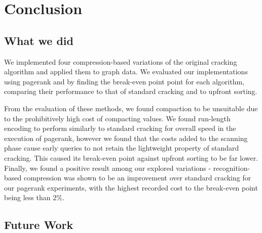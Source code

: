 \chapter{Conclusion}

\label{ch:conclusion}

\section{What we did}

We implemented four compression-based variations of the original cracking algorithm and applied them to graph data. We evaluated our implementations using pagerank and by finding the break-even point point for each algorithm, comparing their performance to that of standard cracking and to upfront sorting. 

From the evaluation of these methods, we found compaction to be unsuitable due to the prohibitively high cost of compacting values. We found run-length encoding to perform similarly to standard cracking for overall speed in the execution of pagerank, however we found that the costs added to the scanning phase cause early queries to not retain the lightweight property of standard cracking. This caused its break-even point against upfront sorting to be far lower. Finally, we found a positive result among our explored variations - recognition-based compression was shown to be an improvement over standard cracking for our pagerank experiments, with the highest recorded cost to the break-even point being less than 2$\%$.

\section{Future Work}

